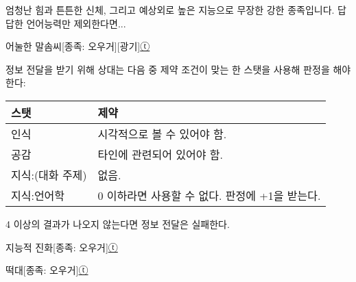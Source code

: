 \documentclass{report}
\begin{document}
	엄청난 힘과 튼튼한 신체, 그리고 예상외로 높은 지능으로 무장한 강한 종족입니다. 답답한 언어능력만 제외한다면...
	
	\begin{story}{어눌한 말솜씨}{[종족: 오우거][광기]\hyperlink{celesteela}{ⓣ}}
		{정보 전달을 받기 위해 상대는 다음 중 제약 조건이 맞는 한 스탯을 사용해 판정을 해야한다:
			
			\begin{tightcenter}
				\begin{tabular}{l!{\color{black}\vrule}l}
					\textbf{스탯}    & \textbf{제약}                                  \\\hline\hline
					인식             & 시각적으로 볼 수 있어야 함.                    \\\hline
					공감             & 타인에 관련되어 있어야 함.                     \\\hline
					지식:(대화 주제) & 없음.                                          \\\hline
					지식:언어학      & 0 이하라면 사용할 수 없다. 판정에 +1을 받는다.
				\end{tabular}
			\end{tightcenter}
			
			4 이상의 결과가 나오지 않는다면 정보 전달은 실패한다.}
		
		
	\end{story}
	
	\begin{story}{지능적 진화}{[종족: 오우거]\hyperlink{celesteela}{ⓣ}}
		
	\end{story}
	
	\begin{story}{떡대}{[종족: 오우거]\hyperlink{celesteela}{ⓣ}}
\iffalse
		\entry{근력 수치가 +1된 것으로 취급한다. 이는 체력 계산에 영향을 미치지 않는다.}
\fi
		
		
		
	\end{story}
\end{document}
